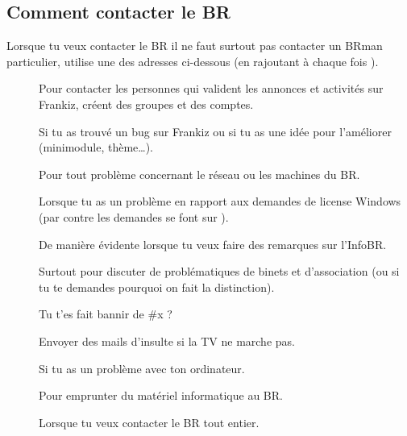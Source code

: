 \subsection{Comment contacter le BR}

Lorsque tu veux contacter le BR il ne faut surtout pas contacter un BRman particulier, utilise une des adresses ci-dessous (en rajoutant à chaque fois ).

\begin{description}

\item[] Pour contacter les personnes qui valident les annonces et activités sur Frankiz, créent des groupes et des comptes.

\item[] Si tu as trouvé un bug sur Frankiz ou si tu as une idée pour l'améliorer (minimodule, thème\dots).

\item[] Pour tout problème concernant le réseau ou les machines du BR.

\item[] Lorsque tu as un problème en rapport aux demandes de license Windows (par contre les demandes se font sur \fkz).

\item[] De manière évidente lorsque tu veux faire des remarques sur l'InfoBR.

\item[] Surtout pour discuter de problématiques de binets et d'association (ou si tu te demandes pourquoi on fait la distinction). 

\item[] Tu t'es fait bannir de \#x ?

\item[] Envoyer des mails d'insulte si la TV ne marche pas.

\item[] Si tu as un problème avec ton ordinateur.

\item[] Pour emprunter du matériel informatique au BR.

\item[] Lorsque tu veux contacter le BR tout entier.

\end{description}
